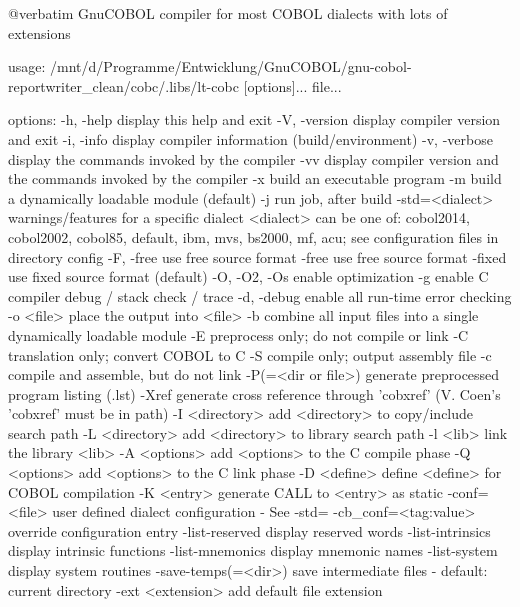 @verbatim
GnuCOBOL compiler for most COBOL dialects with lots of extensions

usage: /mnt/d/Programme/Entwicklung/GnuCOBOL/gnu-cobol-reportwriter_clean/cobc/.libs/lt-cobc [options]... file...

options:
  -h, -help             display this help and exit
  -V, -version          display compiler version and exit
  -i, -info             display compiler information (build/environment)
  -v, -verbose          display the commands invoked by the compiler
  -vv                   display compiler version and the commands
                        invoked by the compiler
  -x                    build an executable program
  -m                    build a dynamically loadable module (default)
  -j                    run job, after build
  -std=<dialect>        warnings/features for a specific dialect
                        <dialect> can be one of:
                        cobol2014, cobol2002, cobol85, default,
                        ibm, mvs, bs2000, mf, acu;
                        see configuration files in directory config
  -F, -free             use free source format
  -free                 use free source format
  -fixed                use fixed source format (default)
  -O, -O2, -Os          enable optimization
  -g                    enable C compiler debug / stack check / trace
  -d, -debug            enable all run-time error checking
  -o <file>             place the output into <file>
  -b                    combine all input files into a single
                        dynamically loadable module
  -E                    preprocess only; do not compile or link
  -C                    translation only; convert COBOL to C
  -S                    compile only; output assembly file
  -c                    compile and assemble, but do not link
  -P(=<dir or file>)    generate preprocessed program listing (.lst)
  -Xref                 generate cross reference through 'cobxref'
                        (V. Coen's 'cobxref' must be in path)
  -I <directory>        add <directory> to copy/include search path
  -L <directory>        add <directory> to library search path
  -l <lib>              link the library <lib>
  -A <options>          add <options> to the C compile phase
  -Q <options>          add <options> to the C link phase
  -D <define>           define <define> for COBOL compilation
  -K <entry>            generate CALL to <entry> as static
  -conf=<file>          user defined dialect configuration - See -std=
  -cb_conf=<tag:value>  override configuration entry
  -list-reserved        display reserved words
  -list-intrinsics      display intrinsic functions
  -list-mnemonics       display mnemonic names
  -list-system          display system routines
  -save-temps(=<dir>)   save intermediate files
                        - default: current directory
  -ext <extension>      add default file extension

